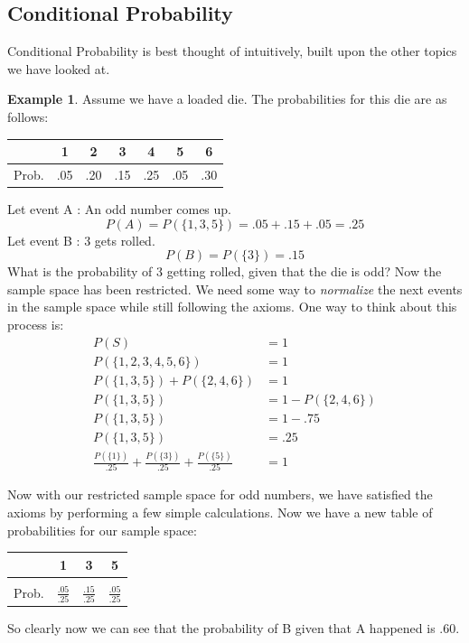 \documentclass{article}
\theoremstyle{plain}
\theoremstyle{definition}
\newtheorem{example}{Example}[section]
\theoremstyle{remark}
\begin{document}
\subsection{Conditional Probability}
Conditional Probability is best thought of intuitively, built upon the other topics we have looked at.
\begin{example}
  Assume we have a loaded die. The probabilities for this die are as follows:\\
  \begin{center}
    \begin{tabular}{r|c c c c c c}
      & 1 & 2 & 3 & 4 & 5 & 6\\
      \hline
      Prob. & .05 & .20 & .15 & .25 & .05 & .30
    \end{tabular}
  \end{center}
  Let event A : An odd number comes up.
  $$
  P(A) = P(\{1,3,5\}) = .05 + .15 + .05 = .25
  $$
  Let event B : 3 gets rolled.
  $$
  P(B) = P(\{3\}) = .15
  $$
  What is the probability of 3 getting rolled, given that the die is odd? Now the sample space has been restricted. We need some way to \textit{normalize} the next events in the sample space while still following the axioms. One way to think about this process is:
\begin{align*}
P(S) &= 1\\
P(\{1,2,3,4,5,6\}) &= 1\\
P(\{1,3,5\}) + P(\{2,4,6\}) &= 1\\
P(\{1,3,5\}) &= 1 - P(\{2,4,6\})\\
P(\{1,3,5\}) &= 1 - .75\\
P(\{1,3,5\}) &= .25\\
\frac{P(\{1\})}{.25} + \frac{P(\{3\})}{.25} + \frac{P(\{5\})}{.25} &= 1
\end{align*}

Now with our restricted sample space for odd numbers, we have satisfied the axioms by performing a few simple calculations. Now we have a new table of probabilities for our sample space:\\
\begin{center}
    \begin{tabular}{r|c c c}
      & 1 & 3 & 5\\
      \hline\\[-5pt]
      Prob. & $\frac{.05}{.25}$ & $\frac{.15}{.25}$ & $\frac{.05}{.25}$
    \end{tabular}
\end{center}
So clearly now we can see that the probability of B given that A happened is $.60$.
\end{example}
\end{document}
